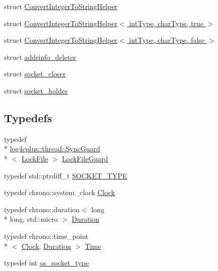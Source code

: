 \begin{DoxyCompactItemize}
\item 
struct \hyperlink{structlog4cplus_1_1helpers_1_1ConvertIntegerToStringHelper}{Convert\-Integer\-To\-String\-Helper}
\item 
struct \hyperlink{structlog4cplus_1_1helpers_1_1ConvertIntegerToStringHelper_3_01intType_00_01charType_00_01true_01_4}{Convert\-Integer\-To\-String\-Helper$<$ int\-Type, char\-Type, true $>$}
\item 
struct \hyperlink{structlog4cplus_1_1helpers_1_1ConvertIntegerToStringHelper_3_01intType_00_01charType_00_01false_01_4}{Convert\-Integer\-To\-String\-Helper$<$ int\-Type, char\-Type, false $>$}
\item 
struct \hyperlink{structlog4cplus_1_1helpers_1_1addrinfo__deleter}{addrinfo\-\_\-deleter}
\item 
struct \hyperlink{structlog4cplus_1_1helpers_1_1socket__closer}{socket\-\_\-closer}
\item 
struct \hyperlink{structlog4cplus_1_1helpers_1_1socket__holder}{socket\-\_\-holder}
\end{DoxyCompactItemize}
\subsection*{Typedefs}
\begin{DoxyCompactItemize}
\item 
typedef \\*
\hyperlink{classlog4cplus_1_1thread_1_1SyncGuard}{log4cplus\-::thread\-::\-Sync\-Guard}\\*
$<$ \hyperlink{classlog4cplus_1_1helpers_1_1LockFile}{Lock\-File} $>$ \hyperlink{namespacelog4cplus_1_1helpers_adf94dab7f623b7d4d8e7eb2eba4e86bd}{Lock\-File\-Guard}
\item 
typedef std\-::ptrdiff\-\_\-t \hyperlink{namespacelog4cplus_1_1helpers_afe2a1567866b6a9e0bfd5d425c3323f2}{S\-O\-C\-K\-E\-T\-\_\-\-T\-Y\-P\-E}
\item 
typedef chrono\-::system\-\_\-clock \hyperlink{namespacelog4cplus_1_1helpers_a9271a4862d21d1ec6e02b5d511bca6ae}{Clock}
\item 
typedef chrono\-::duration$<$ long \\*
long, std\-::micro $>$ \hyperlink{namespacelog4cplus_1_1helpers_a91aca34282a0dda3ca8568ccaa60950c}{Duration}
\item 
typedef chrono\-::time\-\_\-point\\*
$<$ \hyperlink{namespacelog4cplus_1_1helpers_a9271a4862d21d1ec6e02b5d511bca6ae}{Clock}, \hyperlink{namespacelog4cplus_1_1helpers_a91aca34282a0dda3ca8568ccaa60950c}{Duration} $>$ \hyperlink{namespacelog4cplus_1_1helpers_af05d40c37e1cccf9d11d0cbb7426bcd4}{Time}
\item 
typedef int \hyperlink{namespacelog4cplus_1_1helpers_a74064c46dd7651c68c1f58b73a1b14ca}{os\-\_\-socket\-\_\-type}
\end{DoxyCompactItemize}

